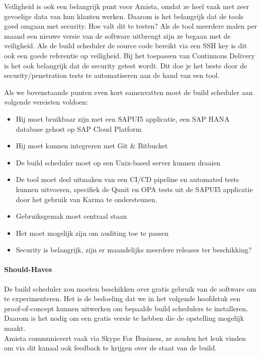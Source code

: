             Veiligheid is ook een belangrijk punt voor Amista, omdat ze heel vaak met zeer gevoelige data van hun klanten werken. Daarom is het belangrijk dat de tools goed omgaan met security. Hoe valt dit te testen? Als de tool meerdere malen per maand een nieuwe versie van de software uitbrengt zijn ze begaan met de veiligheid. Als de build scheduler de source code bereikt via een SSH key is dit ook een goede referentie op veiligheid. Bij het toepassen van Continuous Delivery is het ook belangrijk dat de security getest wordt. Dit doe je het beste door de security/penetration tests te automatiseren aan de hand van een tool.
            
            Als we bovenstaande punten even kort samenvatten moet de build scheduler aan volgende vereisten voldoen:
            \begin{itemize}
                \item Hij moet bruikbaar zijn met een SAPUI5 applicatie, een SAP HANA database gehost op SAP Cloud Platform
                \item Hij moet kunnen integreren met Git \& Bitbucket
                \item De build scheduler moet op een Unix-based server kunnen draaien
                \item De tool moet deel uitmaken van een CI/CD pipeline en automated tests kunnen uitvoeren, specifiek de Qunit en OPA tests uit de SAPUI5 applicatie door het gebruik van Karma te ondersteunen.
                \item Gebruiksgemak moet centraal staan
                \item Het moet mogelijk zijn om auditing toe te passen
                \item Security is belangrijk, zijn er maandelijks meerdere releases ter beschikking?
            \end{itemize}
            
            
            \paragraph{Should-Haves}
            De build scheduler zou moeten beschikken over gratis gebruik van de software om te experimenteren. Het is de bedoeling dat we in het volgende hoofdstuk een proof-of-concept kunnen uitwerken om bepaalde build schedulers te installeren. Daarom is het nodig om een gratis versie te hebben die de opstelling mogelijk maakt.\\
            Amista communiceert vaak via Skype For Business, ze zouden het leuk vinden om via dit kanaal ook feedback te krijgen over de staat van de build.
            

